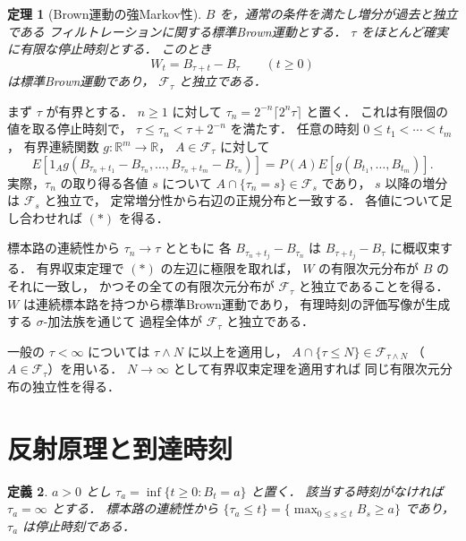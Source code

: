 \documentclass[a5paper,10pt,onecolumn]{jsarticle}
\makeatletter
\theoremstyle{mathnotetheorem}
\newtheorem{theorem}{定理}[section]
\newtheorem{definition}[theorem]{定義}
\renewcommand{\proofname}{証明}
\renewenvironment{proof}[1][\proofname]{%
  \par\pushQED{\qed}\normalfont\topsep4\p@\@plus2\p@\relax
  \trivlist\item[\hskip\labelsep\bfseries #1]\ignorespaces
}{\popQED\endtrivlist\@endpefalse}
\makeatother
\begin{document}
\begin{theorem}[Brown運動の強Markov性]\label{thm:strong-markov}
$B$ を，通常の条件を満たし増分が過去と独立である
フィルトレーションに関する標準Brown運動とする．
$\tau$ をほとんど確実に有限な停止時刻とする．
このとき
\[
 W_t=B_{\tau+t}-B_\tau\qquad(t\ge0)
\]
は標準Brown運動であり，
$\mathcal F_\tau$ と独立である．
\end{theorem}
\begin{proof}
まず $\tau$ が有界とする．
$n\ge1$ に対して
$\tau_n=2^{-n}\lceil2^n\tau\rceil$ と置く．
これは有限個の値を取る停止時刻で，
$\tau\le\tau_n<\tau+2^{-n}$ を満たす．
任意の時刻 $0\le t_1<\cdots<t_m$，
有界連続関数 $g:\mathbb R^m\to\mathbb R$，
$A\in\mathcal F_\tau$ に対して
\[
 E\!\left[1_Ag(B_{\tau_n+t_1}-B_{\tau_n},
 \dots,B_{\tau_n+t_m}-B_{\tau_n})\right]
 =P(A)E[g(B_{t_1},\dots,B_{t_m})].
 \tag{$*$}
\]
実際，$\tau_n$ の取り得る各値 $s$ について
$A\cap\{\tau_n=s\}\in\mathcal F_s$ であり，
$s$ 以降の増分は $\mathcal F_s$ と独立で，
定常増分性から右辺の正規分布と一致する．
各値について足し合わせれば $(*)$ を得る．

標本路の連続性から $\tau_n\to\tau$ とともに
各 $B_{\tau_n+t_j}-B_{\tau_n}$ は
$B_{\tau+t_j}-B_\tau$ に概収束する．
有界収束定理で $(*)$ の左辺に極限を取れば，
$W$ の有限次元分布が $B$ のそれに一致し，
かつその全ての有限次元分布が
$\mathcal F_\tau$ と独立であることを得る．
$W$ は連続標本路を持つから標準Brown運動であり，
有理時刻の評価写像が生成する $\sigma$-加法族を通じて
過程全体が $\mathcal F_\tau$ と独立である．

一般の $\tau<\infty$ については
$\tau\wedge N$ に以上を適用し，
$A\cap\{\tau\le N\}\in\mathcal F_{\tau\wedge N}$
（$A\in\mathcal F_\tau$）を用いる．
$N\to\infty$ として有界収束定理を適用すれば
同じ有限次元分布の独立性を得る．
\end{proof}

\section{反射原理と到達時刻}

\begin{definition}
$a>0$ とし
$\tau_a=\inf\{t\ge0:B_t=a\}$ と置く．
該当する時刻がなければ $\tau_a=\infty$ とする．
標本路の連続性から
$\{\tau_a\le t\}=\{\max_{0\le s\le t}B_s\ge a\}$
であり，$\tau_a$ は停止時刻である．
\end{definition}
\end{document}
